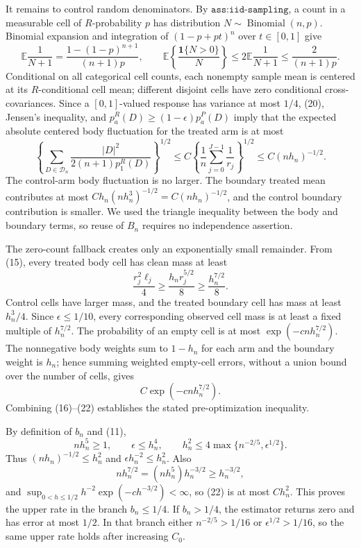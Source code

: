 It remains to control random denominators.  By \(\texttt{ass:iid-sampling}\), a count in a measurable cell of \(R\)-probability \(p\) has distribution \(N\sim\operatorname{Binomial}(n,p)\).  Binomial expansion and integration of \((1-p+pt)^n\) over \(t\in[0,1]\) give
\[
 \mathbb E\frac1{N+1}=\frac{1-(1-p)^{n+1}}{(n+1)p},\qquad
 \mathbb E\left\{\frac{\mathbf1\{N>0\}}N\right\}
 \leq2\mathbb E\frac1{N+1}\leq\frac2{(n+1)p}. \tag{20}
\]
Conditional on all categorical cell counts, each nonempty sample mean is centered at its \(R\)-conditional cell mean; different disjoint cells have zero conditional cross-covariances.  Since a \([0,1]\)-valued response has variance at most \(1/4\), (20), Jensen's inequality, and \(p_a^R(D)\geq(1-\epsilon)p_a^P(D)\) imply that the expected absolute centered body fluctuation for the treated arm is at most
\[
 \left\{\sum_{D\in\mathcal D_n}
 \frac{|D|^2}{2(n+1)p_1^R(D)}\right\}^{1/2}
 \leq C\left\{\frac1n\sum_{j=0}^{J-1}\frac1{r_j}\right\}^{1/2}
 \leq C(nh_n)^{-1/2}. \tag{21}
\]
The control-arm body fluctuation is no larger.  The boundary treated mean contributes at most \(Ch_n(nh_n^3)^{-1/2}=C(nh_n)^{-1/2}\), and the control boundary contribution is smaller.  We used the triangle inequality between the body and boundary terms, so reuse of \(B_n\) requires no independence assertion.

The zero-count fallback creates only an exponentially small remainder.  From (15), every treated body cell has clean mass at least
\[
 \frac{r_j^2\ell_j}{4}\geq\frac{h_nr_j^{5/2}}8\geq\frac{h_n^{7/2}}8.
\]
Control cells have larger mass, and the treated boundary cell has mass at least \(h_n^3/4\).  Since \(\epsilon\leq1/10\), every corresponding observed cell mass is at least a fixed multiple of \(h_n^{7/2}\).  The probability of an empty cell is at most \(\exp(-cnh_n^{7/2})\).  The nonnegative body weights sum to \(1-h_n\) for each arm and the boundary weight is \(h_n\); hence summing weighted empty-cell errors, without a union bound over the number of cells, gives
\[
 C\exp(-cnh_n^{7/2}). \tag{22}
\]
Combining (16)--(22) establishes the stated pre-optimization inequality.

By definition of \(b_n\) and (11),
\[
 nh_n^5\geq1,\qquad \epsilon\leq h_n^4,\qquad
 h_n^2\leq4\max\{n^{-2/5},\epsilon^{1/2}\}. \tag{23}
\]
Thus \((nh_n)^{-1/2}\leq h_n^2\) and \(\epsilon h_n^{-2}\leq h_n^2\).  Also
\[
 nh_n^{7/2}=(nh_n^5)h_n^{-3/2}\geq h_n^{-3/2},
\]
and \(\sup_{0<h\leq1/2}h^{-2}\exp(-ch^{-3/2})<\infty\), so (22) is at most \(C h_n^2\).  This proves the upper rate in the branch \(b_n\leq1/4\).  If \(b_n>1/4\), the estimator returns zero and has error at most \(1/2\).  In that branch either \(n^{-2/5}>1/16\) or \(\epsilon^{1/2}>1/16\), so the same upper rate holds after increasing \(C_0\).


